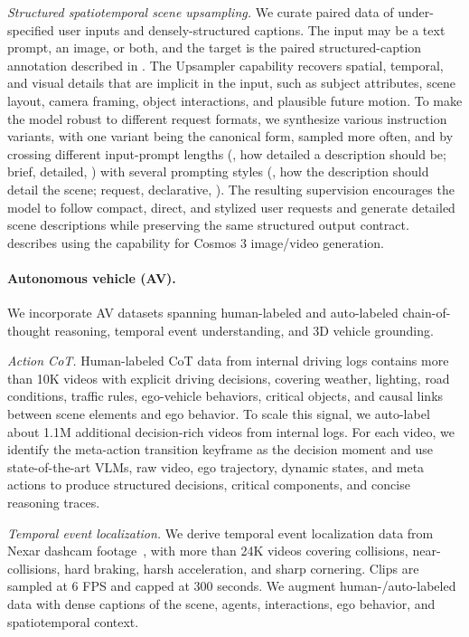 \textit{Structured spatiotemporal scene upsampling.} 
We curate paired data of under-specified user inputs and densely-structured captions. The input  may be a text prompt, an image, or both, and the target is the paired structured-caption annotation described in . The Upsampler capability recovers spatial, temporal, and visual details that are implicit in the input, such as subject attributes, scene layout, camera framing, object interactions, and plausible future motion. To make the model robust to different request formats, we synthesize various instruction variants, with one variant being the canonical form, sampled more often, and by crossing different input-prompt lengths (\eg, how detailed a description should be; brief, detailed, \etc)  with several prompting styles (\eg, how the description should detail the scene; request, declarative, \etc). The resulting supervision encourages the model to follow compact, direct, and stylized user requests and generate detailed scene descriptions while preserving the same structured output contract.  describes using the capability for Cosmos 3 image/video generation.

\paragraph{Autonomous vehicle (AV).} We incorporate AV datasets spanning human-labeled and auto-labeled chain-of-thought reasoning, temporal event understanding, and 3D vehicle grounding.

\textit{Action CoT.} Human-labeled CoT data from internal driving logs contains more than 10K videos with explicit driving decisions, covering weather, lighting, road conditions, traffic rules, ego-vehicle behaviors, critical objects, and causal links between scene elements and ego behavior. To scale this signal, we auto-label about 1.1M additional decision-rich videos from internal logs. For each video, we identify the meta-action transition keyframe as the decision moment and use state-of-the-art VLMs, raw video, ego trajectory, dynamic states, and meta actions to produce structured decisions, critical components, and concise reasoning traces.

\textit{Temporal event localization.} We derive temporal event localization data from Nexar dashcam footage~\citep{dmoura2025nexar}, with more than 24K videos covering collisions, near-collisions, hard braking, harsh acceleration, and sharp cornering. Clips are sampled at 6 FPS and capped at 300 seconds. We augment human-/auto-labeled data with dense captions of the scene, agents, interactions, ego behavior, and spatiotemporal context.

